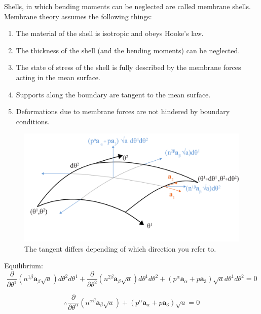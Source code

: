 Shells, in which bending moments can be neglected are called membrane
shells. Membrane theory assumes the following things:

\begin{enumerate}
\item The material of the shell is isotropic and obeys Hooke's law.
\item The thickness of the shell (and the bending moments) can be neglected.
\item The state of stress of the shell is fully described by the membrane
forces acting in the mean surface.
\item Supports along the boundary are tangent to the mean surface.
\item Deformations due to membrane forces are not hindered by boundary
conditions.
\end{enumerate}

\begin{figure}[H]
\centering
\includegraphics[width=0.9\linewidth ]{figure/Theory/membraneDefinition.pdf}
\caption{The tangent differs depending of which direction you refer to. }
\end{figure}


Equilibrium: 
\begin{equation}
\frac{\partial}{\partial \theta^1}(n^{1 \beta}\textbf{a}_{\beta} \sqrt{a}) d\theta^2 d\theta^1 + \frac{\partial}{\partial \theta^2}(n^{2 \beta}\textbf{a}_{\beta} \sqrt{a}) d\theta^1 d\theta^2 + ( p^{\alpha}\textbf{a}_\alpha + p\textbf{a}_3)\sqrt{a} d\theta^1 d\theta^2  = 0
\end{equation}



\begin{equation} \label{membraneEq}
\therefore  \frac{\partial}{\partial \theta^ \alpha} (n^{\alpha \beta} \textbf{a}_\beta \sqrt{ a}) + ( p^{\alpha}\textbf{a}_\alpha + p\textbf{a}_3)\sqrt{a} = 0
\end{equation}

